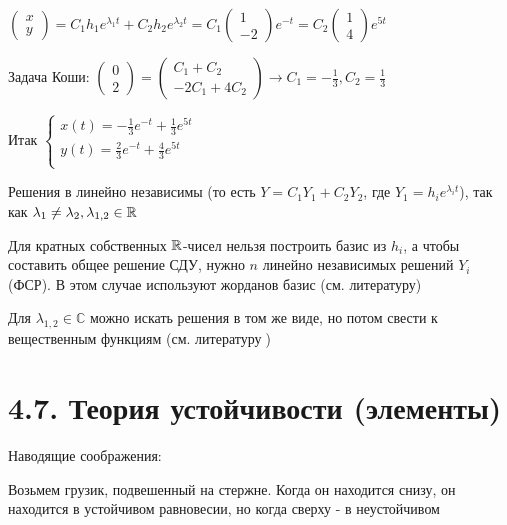\documentclass[12pt]{article}
\begin{document}
    $\begin{pmatrix}x \\ y\end{pmatrix} = C_1 h_1 e^{\lambda_1 t} + C_2 h_2 e^{\lambda_2 t} =
    C_1 \begin{pmatrix}1 \\ -2\end{pmatrix} e^{-t} = C_2 \begin{pmatrix}1 \\ 4\end{pmatrix} e^{5t}$

    Задача Коши: $\begin{pmatrix}0 \\ 2\end{pmatrix} = \begin{pmatrix}
                                                           C_1 + C_2 \\ -2C_1 + 4C_2
    \end{pmatrix} \to C_1 = -\frac{1}{3}, C_2 = \frac{1}{3}$

    Итак $\begin{cases}
              x(t) = -\frac{1}{3} e^{-t} + \frac{1}{3} e^{5t} \\
              y(t) = \frac{2}{3} e^{-t} + \frac{4}{3} e^{5t} \\
    \end{cases}$

    Решения в \Exs линейно независимы (то есть $Y = C_1 Y_1 + C_2 Y_2$, где $Y_1 = h_i e^{\lambda_i t}$), так как $\lambda_1 \neq \lambda_2, \lambda_{1,2} \in \mathbb{R}$

    Для кратных собственных $\mathbb{R}$-чисел нельзя построить базис из $h_i$, а чтобы составить общее решение СДУ,
    нужно $n$ линейно независимых решений $Y_i$ (ФСР). В этом случае используют жорданов базис (см. литературу)

    Для $\lambda_{1,2} \in \mathbb{C}$ можно искать решения в том же виде, но потом свести к вещественным функциям (см. литературу{\huge 🧐})

    \section{4.7. Теория устойчивости (элементы)}

    Наводящие соображения:

    Возьмем грузик, подвешенный на стержне. Когда он находится снизу, он находится в устойчивом равновесии, но когда сверху - в неустойчивом
\end{document}
